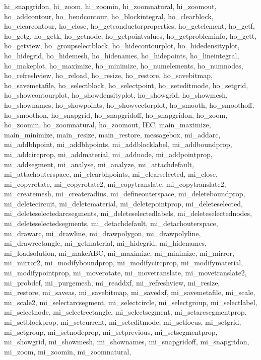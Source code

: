 {{hi_snapgridon, 
hi_zoom, 
hi_zoomin, 
hi_zoomnatural, 
hi_zoomout, 
ho_addcontour, 
ho_bendcontour, 
ho_blockintegral, 
ho_clearblock, 
ho_clearcontour, 
ho_close, 
ho_getconductorproperties, 
ho_getelement, 
ho_getf, 
ho_getg, 
ho_getk, 
ho_getnode, 
ho_getpointvalues, 
ho_getprobleminfo, 
ho_gett, 
ho_getview, 
ho_groupselectblock, 
ho_hidecontourplot, 
ho_hidedensityplot, 
ho_hidegrid, 
ho_hidemesh, 
ho_hidenames, 
ho_hidepoints, 
ho_lineintegral, 
ho_makeplot, 
ho_maximize, 
ho_minimize, 
ho_numelements, 
ho_numnodes, 
ho_refreshview, 
ho_reload, 
ho_resize, 
ho_restore, 
ho_savebitmap, 
ho_savemetafile, 
ho_selectblock, 
ho_selectpoint, 
ho_seteditmode, 
ho_setgrid, 
ho_showcontourplot, 
ho_showdensityplot, 
ho_showgrid, 
ho_showmesh, 
ho_shownames, 
ho_showpoints, 
ho_showvectorplot, 
ho_smooth, 
ho_smoothoff, 
ho_smoothon, 
ho_snapgrid, 
ho_snapgridoff, 
ho_snapgridon, 
ho_zoom, 
ho_zoomin, 
ho_zoomnatural, 
ho_zoomout, 
IEC, 
main_maximize, 
main_minimize, 
main_resize, 
main_restore, 
messagebox, 
mi_addarc, 
mi_addbhpoint, 
mi_addbhpoints, 
mi_addblocklabel, 
mi_addboundprop, 
mi_addcircprop, 
mi_addmaterial, 
mi_addnode, 
mi_addpointprop, 
mi_addsegment, 
mi_analyse, 
mi_analyze, 
mi_attachdefault, 
mi_attachouterspace, 
mi_clearbhpoints, 
mi_clearselected, 
mi_close, 
mi_copyrotate, 
mi_copyrotate2, 
mi_copytranslate, 
mi_copytranslate2, 
mi_createmesh, 
mi_createradius, 
mi_defineouterspace, 
mi_deleteboundprop, 
mi_deletecircuit, 
mi_deletematerial, 
mi_deletepointprop, 
mi_deleteselected, 
mi_deleteselectedarcsegments, 
mi_deleteselectedlabels, 
mi_deleteselectednodes, 
mi_deleteselectedsegments, 
mi_detachdefault, 
mi_detachouterspace, 
mi_drawarc, 
mi_drawline, 
mi_drawpolygon, 
mi_drawpolyline, 
mi_drawrectangle, 
mi_getmaterial, 
mi_hidegrid, 
mi_hidenames, 
mi_loadsolution, 
mi_makeABC, 
mi_maximize, 
mi_minimize, 
mi_mirror, 
mi_mirror2, 
mi_modifyboundprop, 
mi_modifycircprop, 
mi_modifymaterial, 
mi_modifypointprop, 
mi_moverotate, 
mi_movetranslate, 
mi_movetranslate2, 
mi_probdef, 
mi_purgemesh, 
mi_readdxf, 
mi_refreshview, 
mi_resize, 
mi_restore, 
mi_saveas, 
mi_savebitmap, 
mi_savedxf, 
mi_savemetafile, 
mi_scale, 
mi_scale2, 
mi_selectarcsegment, 
mi_selectcircle, 
mi_selectgroup, 
mi_selectlabel, 
mi_selectnode, 
mi_selectrectangle, 
mi_selectsegment, 
mi_setarcsegmentprop, 
mi_setblockprop, 
mi_setcurrent, 
mi_seteditmode, 
mi_setfocus, 
mi_setgrid, 
mi_setgroup, 
mi_setnodeprop, 
mi_setprevious, 
mi_setsegmentprop, 
mi_showgrid, 
mi_showmesh, 
mi_shownames, 
mi_snapgridoff, 
mi_snapgridon, 
mi_zoom, 
mi_zoomin, 
mi_zoomnatural, 
}}

